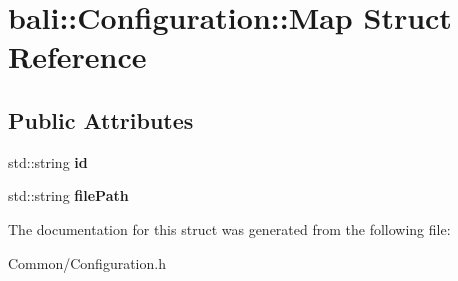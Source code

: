 \hypertarget{structbali_1_1_configuration_1_1_map}{\section{bali\-:\-:Configuration\-:\-:Map Struct Reference}
\label{structbali_1_1_configuration_1_1_map}
}
\subsection*{Public Attributes}
\begin{DoxyCompactItemize}
\item 
\hypertarget{structbali_1_1_configuration_1_1_map_a396a073f05550bae561e938730d70bb9}{std\-::string {\bfseries id}}\label{structbali_1_1_configuration_1_1_map_a396a073f05550bae561e938730d70bb9}

\item 
\hypertarget{structbali_1_1_configuration_1_1_map_a1a2134c0b2d34a390f680f6d51a41192}{std\-::string {\bfseries file\-Path}}\label{structbali_1_1_configuration_1_1_map_a1a2134c0b2d34a390f680f6d51a41192}

\end{DoxyCompactItemize}


The documentation for this struct was generated from the following file\-:\begin{DoxyCompactItemize}
\item 
Common/Configuration.\-h\end{DoxyCompactItemize}
